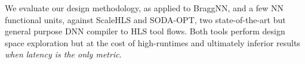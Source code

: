 We evaluate our design methodology, as applied to BraggNN, and a few NN functional units, against ScaleHLS\cite{ye2021scalehls} and SODA-OPT\cite{9516615}, two state-of-the-art but general purpose DNN compiler to HLS tool flows.
Both tools perform design space exploration but at the cost of high-runtimes and ultimately inferior results \emph{when latency is the only metric}.